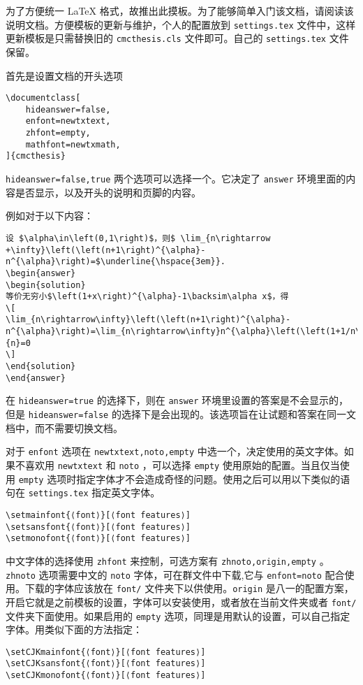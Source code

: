 \documentclass[hideanswer=false,
enfont=newtxtext,
zhfont=empty,
mathfont=newtxmath,
]{cmcthesis}
\begin{document}
	
\addvspace{1\bigskipamount}

为了方便统一 \LaTeX{} 格式，故推出此摸板。为了能够简单入门该文档，请阅读该说明文档。方便模板的更新与维护，个人的配置放到 \verb|settings.tex| 文件中，这样更新模板是只需替换旧的 \verb|cmcthesis.cls| 文件即可。自己的 \verb|settings.tex| 文件保留。

首先是设置文档的开头选项
\begin{lstlisting}[style=tex]
\documentclass[
	hideanswer=false,
	enfont=newtxtext,
	zhfont=empty,
	mathfont=newtxmath,
]{cmcthesis}
\end{lstlisting}
\verb|hideanswer=false,true| 两个选项可以选择一个。它决定了 \verb|answer| 环境里面的内容是否显示，以及开头的说明和页脚的内容。

例如对于以下内容：
\begin{lstlisting}[style=tex]
设 $\alpha\in\left(0,1\right)$，则$ \lim_{n\rightarrow +\infty}\left(\left(n+1\right)^{\alpha}-n^{\alpha}\right)=$\underline{\hspace{3em}}.
\begin{answer}
\begin{solution}
等价无穷小$\left(1+x\right)^{\alpha}-1\backsim\alpha x$，得
\[
\lim_{n\rightarrow\infty}\left(\left(n+1\right)^{\alpha}-n^{\alpha}\right)=\lim_{n\rightarrow\infty}n^{\alpha}\left(\left(1+1/n\right)^{\alpha}-1\right)=\lim_{n\rightarrow\infty}n^{\alpha}\times\frac{\alpha}{n}=0
\]
\end{solution}
\end{answer}
\end{lstlisting}
在 \verb|hideanswer=true| 的选择下，则在 \verb|answer| 环境里设置的答案是不会显示的，但是 \verb|hideanswer=false| 的选择下是会出现的。该选项旨在让试题和答案在同一文档中，而不需要切换文档。

对于 \verb|enfont| 选项在 \verb|newtxtext,noto,empty| 中选一个，决定使用的英文字体。如果不喜欢用 \verb|newtxtext| 和 \verb|noto| ，可以选择 \verb|empty| 使用原始的配置。当且仅当使用 \verb|empty| 选项时指定字体才不会造成奇怪的问题。使用之后可以用以下类似的语句在 \verb|settings.tex| 指定英文字体。
\begin{lstlisting}[style=tex]
\setmainfont{⟨font⟩}[⟨font features⟩]
\setsansfont{⟨font⟩}[⟨font features⟩]
\setmonofont{⟨font⟩}[⟨font features⟩]
\end{lstlisting}

中文字体的选择使用 \verb|zhfont| 来控制，可选方案有 \verb|zhnoto,origin,empty| 。\verb|zhnoto| 选项需要中文的 \verb|noto| 字体，可在群文件中下载,它与 \verb|enfont=noto| 配合使用。下载的字体应该放在 \verb|font/| 文件夹下以供使用。\verb|origin| 是八一的配置方案，开启它就是之前模板的设置，字体可以安装使用，或者放在当前文件夹或者 \verb|font/| 文件夹下面使用。如果启用的 \verb|empty| 选项，同理是用默认的设置，可以自己指定字体。用类似下面的方法指定：
\begin{lstlisting}[style=tex]
\setCJKmainfont{⟨font⟩}[⟨font features⟩]
\setCJKsansfont{⟨font⟩}[⟨font features⟩]
\setCJKmonofont{⟨font⟩}[⟨font features⟩]
\end{lstlisting}
\end{document}
